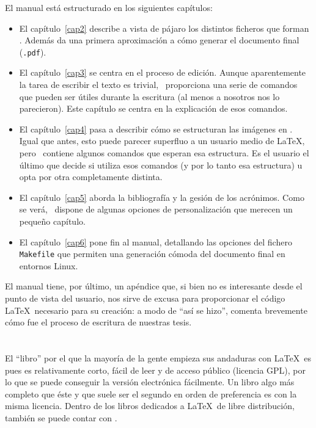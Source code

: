 El manual está estructurado en los siguientes capítulos:

\begin{itemize}
\item El capítulo~\ref{cap2} describe a vista de pájaro los distintos
  ficheros que forman \texis. Además da una primera aproximación
  a cómo generar el documento final (\texttt{.pdf}).

\item El capítulo~\ref{cap3} se centra en el proceso de
  edición. Aunque aparentemente la tarea de escribir el texto es
  trivial, \texis\ proporciona una serie de comandos que pueden
  ser útiles durante la escritura (al menos a nosotros nos lo
  parecieron). Este capítulo se centra en la explicación de esos
  comandos.

\item El capítulo~\ref{cap4} pasa a describir cómo se estructuran las
  imágenes en \texis. Igual que antes, esto puede parecer
  superfluo a un usuario medio de \LaTeX, pero \texis\ contiene
  algunos comandos que esperan esa estructura. Es el usuario el último
  que decide si utiliza esos comandos (y por lo tanto esa estructura)
  u opta por otra completamente distinta.

\item El capítulo~\ref{cap5} aborda la bibliografía y la gesión de los
  acrónimos. Como se verá, \texis\ dispone de algunas opciones de
  personalización que merecen un pequeño capítulo.

\item El capítulo~\ref{cap6} pone fin al manual, detallando las
  opciones del fichero \texttt{Makefile} que permiten una generación
  cómoda del documento final en entornos Linux.
\end{itemize}

El manual tiene, por último, un apéndice que, si bien no es
interesante desde el punto de vista del usuario, nos sirve de excusa
para proporcionar el código \LaTeX\ necesario para su creación: a modo
de ``así se hizo'', comenta brevemente cómo fue el proceso de
escritura de nuestras tesis.


\section*{\NotasBibliograficas}
\TocNotasBibliograficas

El ``libro'' por el que la mayoría de la gente empieza sus andaduras
con \LaTeX\ es \cite{ldesc2e} pues es relativamente corto, fácil de
leer y de acceso público (licencia GPL), por lo que se puede
conseguir la versión electrónica fácilmente. Un libro algo más
completo que éste y que suele ser el segundo en orden de preferencia
es \cite{notsoshort} con la misma licencia. Dentro de los libros
dedicados a \LaTeX\ de libre distribución, también se puede contar con
\cite{latexAPrimer}.

